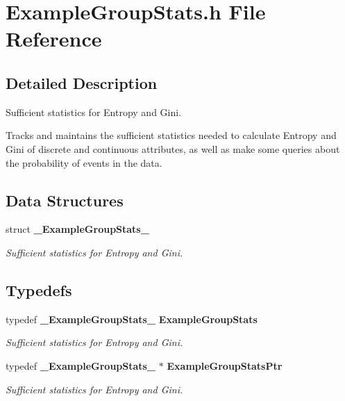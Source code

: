 \section{Example\-Group\-Stats.h File Reference}
\label{ExampleGroupStats_8h}


\subsection{Detailed Description}
Sufficient statistics for Entropy and Gini. 

Tracks and maintains the sufficient statistics needed to calculate Entropy and Gini of discrete and continuous attributes, as well as make some queries about the probability of events in the data.

\subsection*{Data Structures}
\begin{CompactItemize}
\item 
struct {\bf \_\-Example\-Group\-Stats\_\-}
\begin{CompactList}\small\item\em Sufficient statistics for Entropy and Gini. \item\end{CompactList}\end{CompactItemize}
\subsection*{Typedefs}
\begin{CompactItemize}
\item 
typedef {\bf \_\-Example\-Group\-Stats\_\-} {\bf Example\-Group\-Stats}
\begin{CompactList}\small\item\em Sufficient statistics for Entropy and Gini. \item\end{CompactList}\item 
typedef {\bf \_\-Example\-Group\-Stats\_\-} $\ast$ {\bf Example\-Group\-Stats\-Ptr}
\begin{CompactList}\small\item\em Sufficient statistics for Entropy and Gini. \item\end{CompactList}\end{CompactItemize}
